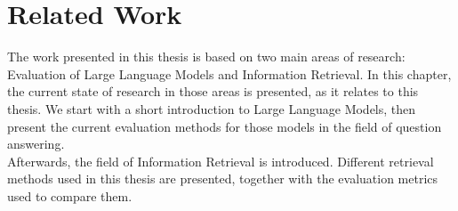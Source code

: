 \chapter{Related Work}\label{related-work}
The work presented in this thesis is based on two main areas of research: Evaluation of Large Language Models and Information Retrieval.
In this chapter, the current state of research in those areas is presented, as it relates to this thesis.
We start with a short introduction to Large Language Models, then present the current evaluation methods for those models in the field of question answering.
\\
Afterwards, the field of Information Retrieval is introduced.
Different retrieval methods used in this thesis are presented, together with the evaluation metrics used to compare them.

